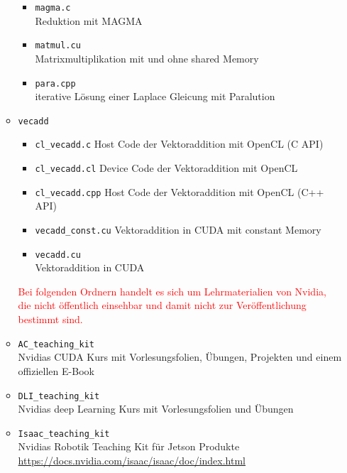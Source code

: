 \documentclass[headsepline=3pt,headinclude=true,12pt,oneside]{scrartcl}
\let\li=\lstinline
\begin{document}
\begin{itemize}
\begin{itemize}
\begin{itemize}
				\item \li`magma.c` \\
				Reduktion mit MAGMA
				
				\item \li`matmul.cu` \\
				Matrixmultiplikation mit und ohne shared Memory
				
				\item \li`para.cpp` \\
				iterative Lösung einer Laplace Gleicung mit Paralution
			\end{itemize}
			
			\item \li`vecadd`
			\begin{itemize}
				\item \li`cl_vecadd.c`  
				Host Code der Vektoraddition mit OpenCL (C API) 
			
				\item \li`cl_vecadd.cl`  
				Device Code der Vektoraddition mit OpenCL
			 
				\item \li`cl_vecadd.cpp`  
				Host Code der Vektoraddition mit OpenCL (C++ API) 
			
				\item \li`vecadd_const.cu` 
				Vektoraddition in CUDA mit constant Memory
			
				\item \li`vecadd.cu` \\
				Vektoraddition in CUDA
			\end{itemize}
			
			\textcolor{red}{Bei folgenden Ordnern handelt es sich um Lehrmaterialien von Nvidia, die nicht öffentlich einsehbar und damit nicht zur Veröffentlichung bestimmt sind.}
			
			\item \li`AC_teaching_kit` \\
			Nvidias CUDA Kurs mit Vorlesungsfolien, Übungen, Projekten und einem offiziellen E-Book
			
			\item \li`DLI_teaching_kit` \\
			Nvidias deep Learning Kurs mit Vorlesungsfolien und Übungen
			
			\item \li`Isaac_teaching_kit` \\
			Nvidias Robotik Teaching Kit für Jetson Produkte \\
			\url{https://docs.nvidia.com/isaac/isaac/doc/index.html}
			

\end{itemize}
\end{itemize}
\end{document}
